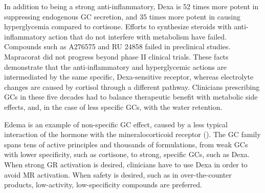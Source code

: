\documentclass[12pt,english]{report}\usepackage[]{graphicx}\usepackage[]{color}
\begin{document}
In addition to being a strong anti-inflammatory, Dexa is 52 times
more potent in suppressing endogenous GC secretion, and 35 times more
potent in causing hyperglycemia compared to cortisone\citep{frawley1959effects,meikle1977potency}.
Efforts to synthesize steroids with anti-inflammatory action that
do not interfere with metabolism have failed. Compounds such as A276575\citep{lin2002trans-activation}
and RU 24858\citep{belvisi2001therapeutic} failed in preclinical
studies. Mapracorat\citep{baiula2014mapracorat} did not progress
beyond phase II clinical trials. These facts demonstrate that the
anti-inflammatory and hyperglycemic actions are intermediated by the
same specific, Dexa-sensitive receptor, whereas electrolyte changes
are caused by cortisol through a different pathway. Clinicians prescribing
GCs in these five decades had to balance therapeutic benefit with
metabolic side effects, and, in the case of less specific GCs, with
the water retention.

Edema is an example of non-specific GC effect, caused by a less typical
interaction of the hormone with the mineralocorticoid receptor ().
The GC family spans tens of active principles and thousands of formulations,
from weak GCs with lower specificity, such as cortisone, to strong,
specific GCs, such as Dexa. When strong GR activation is desired,
clinicians have to use Dexa in order to avoid MR activation. When
safety is desired, such as in over-the-counter products, low-activity,
low-specificity compounds are preferred.
\end{document}

